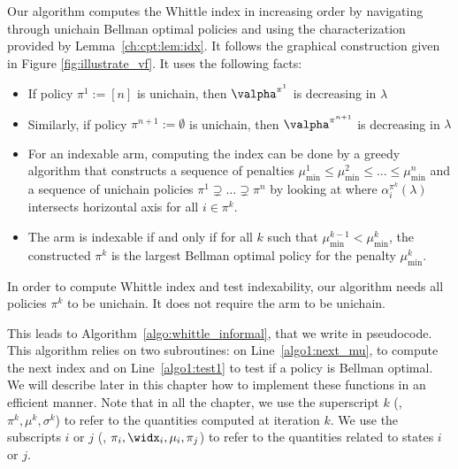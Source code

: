 Our algorithm computes the Whittle index in increasing order by navigating through unichain Bellman optimal policies and using the characterization provided by Lemma~\ref{ch:cpt:lem:idx}.
It follows the graphical construction given in Figure \ref{fig:illustrate_vf}. It uses the following facts:
\begin{itemize}
    \item If policy $\pi^1:=[n]$ is unichain, then $\valpha^{\pi^1}$ is decreasing in $\lambda$
    \item Similarly, if policy $\pi^{n+1}:=\emptyset$ is unichain, then $\valpha^{\pi^{n+1}}$ is decreasing in $\lambda$
    \item For an indexable arm, computing the index can be done by a greedy algorithm that constructs a sequence of penalties $\mu^1_{\min}\le\mu^2_{\min}\le\dots\le\mu^n_{\min}$ and a sequence of unichain policies $\pi^1\supsetneq\dots\supsetneq\pi^{n}$ by looking at where $\alpha^{\pi^k}_i(\lambda)$ intersects horizontal axis for all $i\in\pi^k$.
    \item The arm is indexable if and only if for all $k$ such that $\mu^{k-1}_{\min}<\mu^{k}_{\min}$, the constructed $\pi^k$ is the largest Bellman optimal policy for the penalty $\mu^k_{\min}$.
\end{itemize}
In order to compute Whittle index and test indexability, our algorithm needs all policies $\pi^k$ to be unichain.
It does not require the arm to be unichain. 

This leads to Algorithm~\ref{algo:whittle_informal}, that we write in pseudocode.
This algorithm relies on two subroutines: on Line~\ref{algo1:next_mu}, to compute the next index and on Line~\ref{algo1:test1} to test if a policy is Bellman optimal.
We will describe later in this chapter how to implement these functions in an efficient manner.
Note that in all the chapter, we use the superscript $k$ (\ie, $\pi^k, \mu^k, \sigma^k$) to refer to the quantities computed at iteration $k$.
We use the subscripts $i$ or $j$ (\ie, $\pi_i, \widx_i, \mu_i, \pi_j$) to refer to the quantities related to states $i$ or $j$.

